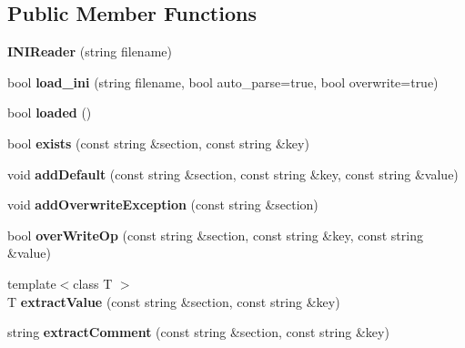 \subsection*{\-Public \-Member \-Functions}
\begin{DoxyCompactItemize}
\item 
\hypertarget{classINIReader_aba944f62ed61ac43e14cf87a39830e36}{{\bfseries \-I\-N\-I\-Reader} (string filename)}\label{d5/de4/classINIReader_aba944f62ed61ac43e14cf87a39830e36}

\item 
\hypertarget{classINIReader_aea486d4afeda8c4ad491e3032c3e855b}{bool {\bfseries load\-\_\-ini} (string filename, bool auto\-\_\-parse=true, bool overwrite=true)}\label{d5/de4/classINIReader_aea486d4afeda8c4ad491e3032c3e855b}

\item 
\hypertarget{classINIReader_a61ccb2039611fe129cbd803a483b95a1}{bool {\bfseries loaded} ()}\label{d5/de4/classINIReader_a61ccb2039611fe129cbd803a483b95a1}

\item 
\hypertarget{classINIReader_ac43eedc1266d7d48c4f862fc015f7716}{bool {\bfseries exists} (const string \&section, const string \&key)}\label{d5/de4/classINIReader_ac43eedc1266d7d48c4f862fc015f7716}

\item 
\hypertarget{classINIReader_a9c097d869f3182731b83beb74bf67b7a}{void {\bfseries add\-Default} (const string \&section, const string \&key, const string \&value)}\label{d5/de4/classINIReader_a9c097d869f3182731b83beb74bf67b7a}

\item 
\hypertarget{classINIReader_af8aa397c78db338f067f384184532262}{void {\bfseries add\-Overwrite\-Exception} (const string \&section)}\label{d5/de4/classINIReader_af8aa397c78db338f067f384184532262}

\item 
\hypertarget{classINIReader_a90cd9a87f04299508a595ae73c5a5b96}{bool {\bfseries over\-Write\-Op} (const string \&section, const string \&key, const string \&value)}\label{d5/de4/classINIReader_a90cd9a87f04299508a595ae73c5a5b96}

\item 
\hypertarget{classINIReader_aa5e196e5706f611359735721241ad126}{{\footnotesize template$<$class T $>$ }\\\-T {\bfseries extract\-Value} (const string \&section, const string \&key)}\label{d5/de4/classINIReader_aa5e196e5706f611359735721241ad126}

\item 
\hypertarget{classINIReader_a390fc2ab035424a5dbb3d71dec787080}{string {\bfseries extract\-Comment} (const string \&section, const string \&key)}\label{d5/de4/classINIReader_a390fc2ab035424a5dbb3d71dec787080}

\end{DoxyCompactItemize}
